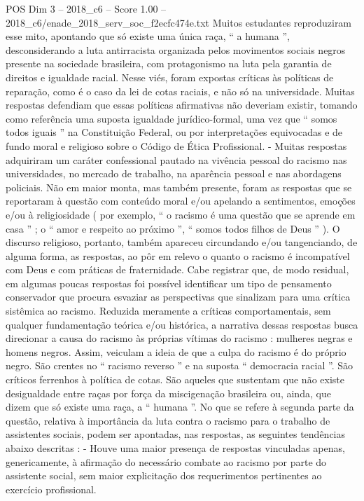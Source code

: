\begin{textsample}{POS Dim 3 – 2018\_c6 – Score 1.00 – 2018\_c6/enade\_2018\_serv\_soc\_f2ecfc474e.txt}
Muitos estudantes reproduziram esse mito, apontando que só existe uma única raça, “ a humana ”, desconsiderando a luta antirracista organizada pelos movimentos sociais negros presente na sociedade brasileira, com protagonismo na luta pela garantia de direitos e igualdade racial.
Nesse viés, foram expostas críticas às políticas de reparação, como é o caso da lei de cotas raciais, e não só na universidade.
Muitas respostas defendiam que essas políticas afirmativas não deveriam existir, tomando como referência uma suposta igualdade jurídico-formal, uma vez que “ somos todos iguais ” na Constituição Federal, ou por interpretações equivocadas e de fundo moral e religioso sobre o Código de Ética Profissional. - Muitas respostas adquiriram um caráter confessional pautado na vivência pessoal do racismo nas universidades, no mercado de trabalho, na aparência pessoal e nas abordagens policiais.
Não em maior monta, mas também presente, foram as respostas que se reportaram à questão com conteúdo moral e/ou apelando a sentimentos, emoções e/ou à religiosidade ( por exemplo, “ o racismo é uma questão que se aprende em casa ” ; o “ amor e respeito ao próximo ”, “ somos todos filhos de Deus ” ).
O discurso religioso, portanto, também apareceu circundando e/ou tangenciando, de alguma forma, as respostas, ao pôr em relevo o quanto o racismo é incompatível com Deus e com práticas de fraternidade.
Cabe registrar que, de modo residual, em algumas poucas respostas foi possível identificar um tipo de pensamento conservador que procura esvaziar as perspectivas que sinalizam para uma crítica sistêmica ao racismo.
Reduzida meramente a críticas comportamentais, sem qualquer fundamentação teórica e/ou histórica, a narrativa dessas respostas busca direcionar a causa do racismo às próprias vítimas do racismo : mulheres negras e homens negros.
Assim, veiculam a ideia de que a culpa do racismo é do próprio negro.
São crentes no “ racismo reverso ” e na suposta “ democracia racial ”.
São críticos ferrenhos à política de cotas.
São aqueles que sustentam que não existe desigualdade entre raças por força da miscigenação brasileira ou, ainda, que dizem que só existe uma raça, a “ humana ”.
No que se refere à segunda parte da questão, relativa à importância da luta contra o racismo para o trabalho de assistentes sociais, podem ser apontadas, nas respostas, as seguintes tendências abaixo descritas : - Houve uma maior presença de respostas vinculadas apenas, genericamente, à afirmação do necessário combate ao racismo por parte do assistente social, sem maior explicitação dos requerimentos pertinentes ao exercício profissional.

\end{textsample}
